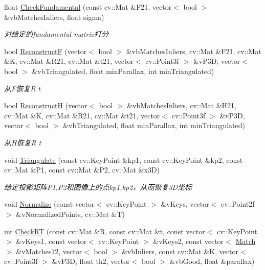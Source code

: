 \begin{DoxyCompactItemize}
float \mbox{\hyperlink{class_o_r_b___s_l_a_m2_1_1_initializer_a1c8b74679a5cb1af16c07c8a00c8e8c0}{Check\+Fundamental}} (const cv\+::\+Mat \&F21, vector$<$ bool $>$ \&vb\+Matches\+Inliers, float sigma)
\begin{DoxyCompactList}\small\item\em 对给定的fundamental matrix打分 \end{DoxyCompactList}\item 
bool \mbox{\hyperlink{class_o_r_b___s_l_a_m2_1_1_initializer_a60796f88f1b3e981ad925a8b566f6315}{ReconstructF}} (vector$<$ bool $>$ \&vb\+Matches\+Inliers, cv\+::\+Mat \&F21, cv\+::\+Mat \&K, cv\+::\+Mat \&R21, cv\+::\+Mat \&t21, vector$<$ cv\+::\+Point3f $>$ \&v\+P3D, vector$<$ bool $>$ \&vb\+Triangulated, float min\+Parallax, int min\+Triangulated)
\begin{DoxyCompactList}\small\item\em 从\+F恢复R t \end{DoxyCompactList}\item 
bool \mbox{\hyperlink{class_o_r_b___s_l_a_m2_1_1_initializer_addc1c05d3b7a5ae35805f69b50f368ea}{ReconstructH}} (vector$<$ bool $>$ \&vb\+Matches\+Inliers, cv\+::\+Mat \&H21, cv\+::\+Mat \&K, cv\+::\+Mat \&R21, cv\+::\+Mat \&t21, vector$<$ cv\+::\+Point3f $>$ \&v\+P3D, vector$<$ bool $>$ \&vb\+Triangulated, float min\+Parallax, int min\+Triangulated)
\begin{DoxyCompactList}\small\item\em 从\+H恢复R t \end{DoxyCompactList}\item 
void \mbox{\hyperlink{class_o_r_b___s_l_a_m2_1_1_initializer_a3bdf78e0f16be44b5ab312aac5cac5af}{Triangulate}} (const cv\+::\+Key\+Point \&kp1, const cv\+::\+Key\+Point \&kp2, const cv\+::\+Mat \&P1, const cv\+::\+Mat \&P2, cv\+::\+Mat \&x3D)
\begin{DoxyCompactList}\small\item\em 给定投影矩阵\+P1,P2和图像上的点kp1,kp2，从而恢复3\+D坐标 \end{DoxyCompactList}\item 
void \mbox{\hyperlink{class_o_r_b___s_l_a_m2_1_1_initializer_a44ce7aa73741d900d2becc0d8f14c1af}{Normalize}} (const vector$<$ cv\+::\+Key\+Point $>$ \&v\+Keys, vector$<$ cv\+::\+Point2f $>$ \&v\+Normalized\+Points, cv\+::\+Mat \&T)
\item 
int \mbox{\hyperlink{class_o_r_b___s_l_a_m2_1_1_initializer_a72e79f6486468cde9abd87b873d840e7}{Check\+RT}} (const cv\+::\+Mat \&R, const cv\+::\+Mat \&t, const vector$<$ cv\+::\+Key\+Point $>$ \&v\+Keys1, const vector$<$ cv\+::\+Key\+Point $>$ \&v\+Keys2, const vector$<$ \mbox{\hyperlink{class_o_r_b___s_l_a_m2_1_1_initializer_ad0bf21297bc6271e7d014ce41d6ff7d4}{Match}} $>$ \&v\+Matches12, vector$<$ bool $>$ \&vb\+Inliers, const cv\+::\+Mat \&K, vector$<$ cv\+::\+Point3f $>$ \&v\+P3D, float th2, vector$<$ bool $>$ \&vb\+Good, float \&parallax)

\end{DoxyCompactItemize}
